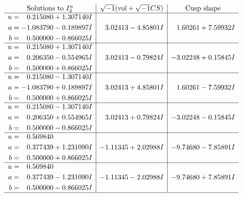 \documentclass[1p]{elsarticle_modified}
\theoremstyle{definition}
\newcommand{\I}{\sqrt{-1}}
\begin{document}
$$\begin{array}{c|c|c}  
\text{Solutions to }I^u_{2}& \I (\text{vol} + \sqrt{-1}CS) & \text{Cusp shape}\\
 \hline 
\begin{aligned}
u &= \phantom{-}0.215080 + 1.307140 I \\
a &= -1.083790 - 0.189897 I \\
b &= \phantom{-}0.500000 - 0.866025 I\end{aligned}
 & \phantom{-}3.02413 - 4.85801 I & \phantom{-}1.60261 + 7.59932 I \\ \hline\begin{aligned}
u &= \phantom{-}0.215080 + 1.307140 I \\
a &= \phantom{-}0.206350 - 0.554965 I \\
b &= \phantom{-}0.500000 + 0.866025 I\end{aligned}
 & \phantom{-}3.02413 - 0.79824 I & -3.02248 + 0.15845 I \\ \hline\begin{aligned}
u &= \phantom{-}0.215080 - 1.307140 I \\
a &= -1.083790 + 0.189897 I \\
b &= \phantom{-}0.500000 + 0.866025 I\end{aligned}
 & \phantom{-}3.02413 + 4.85801 I & \phantom{-}1.60261 - 7.59932 I \\ \hline\begin{aligned}
u &= \phantom{-}0.215080 - 1.307140 I \\
a &= \phantom{-}0.206350 + 0.554965 I \\
b &= \phantom{-}0.500000 - 0.866025 I\end{aligned}
 & \phantom{-}3.02413 + 0.79824 I & -3.02248 - 0.15845 I \\ \hline\begin{aligned}
u &= \phantom{-}0.569840\phantom{ +0.000000I} \\
a &= \phantom{-}0.377439 + 1.231090 I \\
b &= \phantom{-}0.500000 + 0.866025 I\end{aligned}
 & -1.11345 + 2.02988 I & -9.74680 - 7.85891 I \\ \hline\begin{aligned}
u &= \phantom{-}0.569840\phantom{ +0.000000I} \\
a &= \phantom{-}0.377439 - 1.231090 I \\
b &= \phantom{-}0.500000 - 0.866025 I\end{aligned}
 & -1.11345 - 2.02988 I & -9.74680 + 7.85891 I\\
 \hline 
 \end{array}$$\newpage
\end{document}
